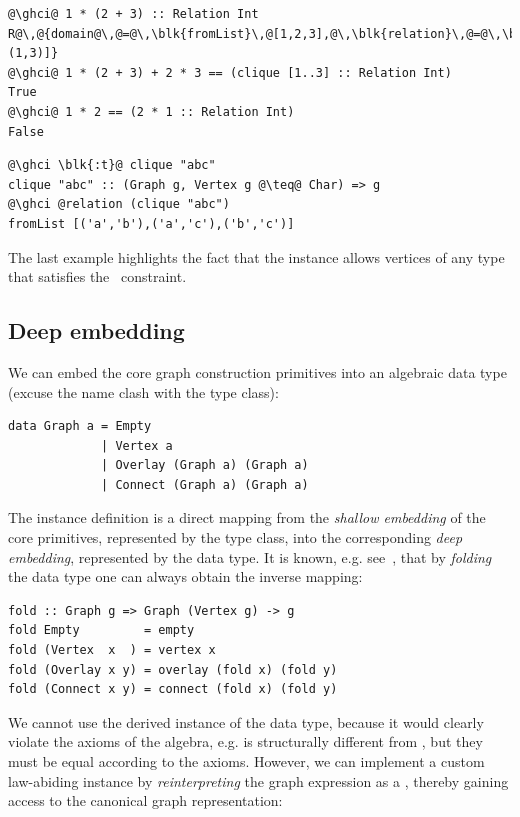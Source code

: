 \begin{verbatim}
@\ghci@ 1 * (2 + 3) :: Relation Int
R@\,@{domain@\,@=@\,\blk{fromList}\,@[1,2,3],@\,\blk{relation}\,@=@\,\blk{fromList}\,@[(1,2),(1,3)]}
@\ghci@ 1 * (2 + 3) + 2 * 3 == (clique [1..3] :: Relation Int)
True
@\ghci@ 1 * 2 == (2 * 1 :: Relation Int)
False
\end{verbatim}
\begin{verbatim}
@\ghci \blk{:t}@ clique "abc"
clique "abc" :: (Graph g, Vertex g @\teq@ Char) => g
@\ghci @relation (clique "abc")
fromList [('a','b'),('a','c'),('b','c')]
\end{verbatim}

\noindent
The last example highlights the fact that the  instance allows vertices
of any type  that satisfies the~ constraint.

\subsection{Deep embedding}\label{sub-embedding}

We can embed the core graph construction primitives into an algebraic data type
(excuse the name clash with the type class):

\begin{verbatim}
data Graph a = Empty
             | Vertex a
             | Overlay (Graph a) (Graph a)
             | Connect (Graph a) (Graph a)
\end{verbatim}

The instance definition is a direct mapping from the \emph{shallow embedding}
of the core primitives, represented by the type class, into the
corresponding \emph{deep embedding}, represented by the data type.
It is known, e.g. see~\citet{2014_gibbons_folding}, that by \emph{folding} the data
type one can always obtain the inverse mapping:

\begin{verbatim}
fold :: Graph g => Graph (Vertex g) -> g
fold Empty         = empty
fold (Vertex  x  ) = vertex x
fold (Overlay x y) = overlay (fold x) (fold y)
fold (Connect x y) = connect (fold x) (fold y)
\end{verbatim}

We cannot use the derived  instance of the  data type, because it
would clearly violate the axioms of the algebra, e.g.  is
structurally different from , but they must be equal according to the axioms.
However, we can implement a custom law-abiding 
instance by \emph{reinterpreting} the graph expression
as a , thereby gaining access to the canonical graph representation:

